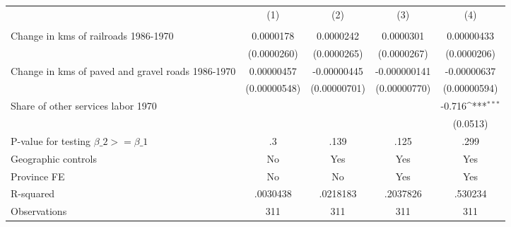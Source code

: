 {
\def\sym#1{\ifmmode^{#1}\else\(^{#1}\)\fi}
\begin{tabular}{l*{4}{c}}
\hline\hline
                &\multicolumn{1}{c}{(1)}&\multicolumn{1}{c}{(2)}&\multicolumn{1}{c}{(3)}&\multicolumn{1}{c}{(4)}\\
                &\multicolumn{1}{c}{}&\multicolumn{1}{c}{}&\multicolumn{1}{c}{}&\multicolumn{1}{c}{}\\
\hline
Change in kms of railroads 1986-1970&0.0000178         &0.0000242         &0.0000301         &0.00000433         \\
                &(0.0000260)         &(0.0000265)         &(0.0000267)         &(0.0000206)         \\
[1em]
Change in kms of paved and gravel roads 1986-1970&0.00000457         &-0.00000445         &-0.000000141         &-0.00000637         \\
                &(0.00000548)         &(0.00000701)         &(0.00000770)         &(0.00000594)         \\
[1em]
Share of other services labor 1970&                  &                  &                  &   -0.716\sym{***}\\
                &                  &                  &                  & (0.0513)         \\
\hline
P-value for testing $\beta\_{2} >= \beta\_{1}$&       .3         &     .139         &     .125         &     .299         \\
Geographic controls&       No         &      Yes         &      Yes         &      Yes         \\
Province FE     &       No         &       No         &      Yes         &      Yes         \\
R-squared       & .0030438         & .0218183         & .2037826         &  .530234         \\
Observations    &      311         &      311         &      311         &      311         \\
\hline\hline
\end{tabular}
}
